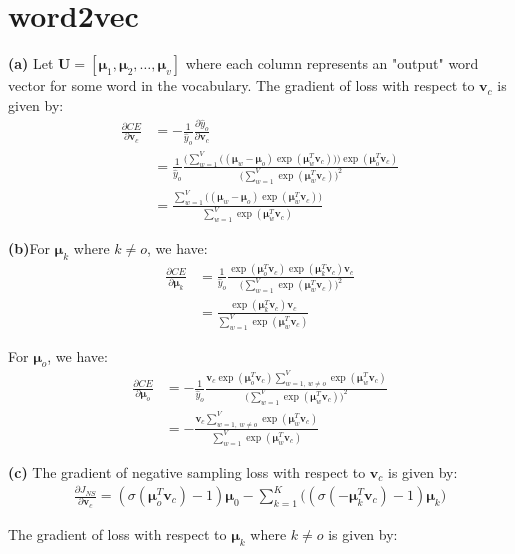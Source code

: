 \documentclass[10pt, a4paper]{ctexart}
\begin{document}
\section{word2vec}
{\bf{(a)}} Let ${\bm U}=[{\bm \mu}_1, {\bm \mu}_2,\dots, {\bm \mu}_v]$ where each column represents an "output" word vector for some word in the vocabulary. The gradient of loss with respect to ${\bm v}_c$ is given by:
\begin{align*}
    \frac{\partial CE}{\partial {\bm v}_c}&=-\frac{1}{\hat{y}_o}\frac{\partial \hat{y}_o}{\partial{\bm v}_c}\\
    &=\frac{1}{\hat{y}_o}\frac{\bigg(\sum_{w=1}^V\big(({\bm \mu}_w-{\bm \mu}_o)\exp({\bm \mu}_w^T{\bm v}_c)\big)\bigg)\exp({\bm \mu}_o^T{\bm v}_c)}{\bigg(\sum_{w=1}^V\exp({\bm \mu}_w^T{\bm v}_c)\bigg)^2}\\
    &=\frac{\sum_{w=1}^V\big(({\bm \mu}_w-{\bm \mu}_o)\exp({\bm \mu}_w^T{\bm v}_c)\big)}{\sum_{w=1}^V\exp({\bm \mu}_w^T{\bm v}_c)}
\end{align*}\par
{\bf{(b)}}For ${\bm \mu}_k$ where $k\ne o$, we have:
\begin{align*}
    \frac{\partial CE}{\partial {\bm \mu}_k}&=\frac{1}{\hat{y}_o}\frac{\exp({\bm \mu}_o^T{\bm v}_c)\exp({\bm \mu}_k^T{\bm v}_c){\bm v}_c}{\bigg(\sum_{w=1}^V\exp({\bm \mu}_w^T{\bm v}_c)\bigg)^2}\\
    &=\frac{\exp({\bm \mu}_k^T{\bm v}_c){\bm v}_c}{\sum_{w=1}^V\exp({\bm \mu}_w^T{\bm v}_c)}
\end{align*}\par
For ${\bm \mu}_o$, we have:
\begin{align*}
    \frac{\partial CE}{\partial {\bm \mu}_o}&=-\frac{1}{\hat{y}_o}\frac{{\bm v}_c\exp({\bm \mu}_o^T{\bm v}_c)\sum_{w=1,~w\ne o}^V\exp({\bm \mu}_w^T{\bm v}_c)}{\bigg(\sum_{w=1}^V\exp({\bm \mu}_w^T{\bm v}_c)\bigg)^2}\\
    &=-\frac{{\bm v}_c\sum_{w=1,~w\ne o}^V\exp({\bm \mu}_w^T{\bm v}_c)}{\sum_{w=1}^V\exp({\bm \mu}_w^T{\bm v}_c)}
\end{align*}\par
{\bf{(c)}} The gradient of negative sampling loss with respect to ${\bm v}_c$ is given by:
\begin{align*}
    \frac{\partial J_{NS}}{\partial {\bm v}_c} = (\sigma({\bm \mu}_o^T{\bm v}_c)-1){\bm \mu}_0-\sum_{k=1}^K\bigg((\sigma(-{\bm \mu}_k^T{\bm v}_c)-1){\bm \mu}_k\bigg)
\end{align*}\par
The gradient of loss with respect to ${\bm \mu}_k$ where $k\ne o$ is given by:
\end{document}
